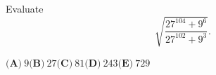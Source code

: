 Evaluate
\[\sqrt{\dfrac{27^{104}+9^{6}}{27^{102}+9^{3}}}.\]

$\textbf{(A)}\ 9$\qquad$\textbf{(B)}\ 27$\qquad$\textbf{(C)}\ 81$\qquad$\textbf{(D)}\ 243$\qquad$\textbf{(E)}\ 729$
